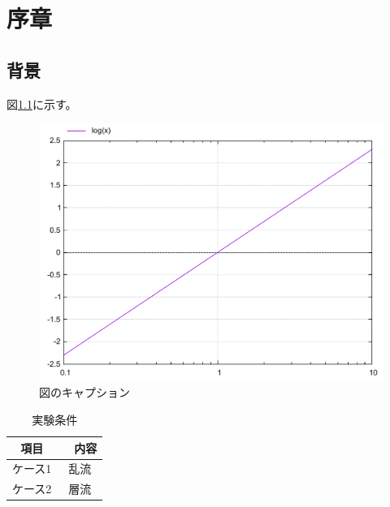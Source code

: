\chapter{序章}
\section{背景}

図\ref{fig:log}に示す。

\begin{figure}[htbp]
    \centering
    \includegraphics[scale=0.5]{Fig/log-fig.pdf}
    \caption{図のキャプション}
    \label{fig:log}
\end{figure}

\begin{table}[htbp]
    \centering
     \caption{実験条件}
    \begin{tabular}{cc}
    項目     & 　内容 \\\hline
    ケース1     & 乱流 \\
    ケース2  &  層流 \\\hline
    \end{tabular}
       \label{tab:condition}
\end{table}